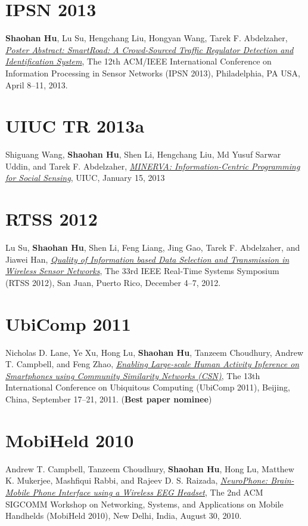 \section{\sc IPSN 2013}\hypertarget{hu2013ipsn}{} \textbf{Shaohan Hu}, Lu Su, Hengchang Liu, Hongyan Wang, Tarek F. Abdelzaher, \href{http://portal.acm.org/citation.cfm?id=2461433}{\emph{Poster Abstract: SmartRoad: A Crowd-Sourced Traffic Regulator Detection and Identification System}}, \textsf{The 12th ACM/IEEE International Conference on Information Processing in Sensor Networks (IPSN 2013)}, Philadelphia, PA USA, April 8--11, 2013.

\section{\sc UIUC TR 2013a}\hypertarget{wang2013uiuc}{} Shiguang Wang, \textbf{Shaohan Hu}, Shen Li, Hengchang Liu, Md Yusuf Sarwar Uddin, and Tarek F. Abdelzaher, \href{https://www.ideals.illinois.edu/handle/2142/42511}{\emph{MINERVA: Information-Centric Programming for Social Sensing}}, \textsf{UIUC}, January 15, 2013

\section{\sc RTSS 2012}\hypertarget{su2012rtss}{} Lu Su, \textbf{Shaohan Hu}, Shen Li, Feng Liang, Jing Gao, Tarek F. Abdelzaher, and Jiawei Han, \href{http://ieeexplore.ieee.org/xpl/articleDetails.jsp?arnumber=6424815}{\emph{Quality of Information based Data Selection and Transmission in Wireless Sensor Networks}}, \textsf{The 33rd IEEE Real-Time Systems Symposium (RTSS 2012)}, San Juan, Puerto Rico, December 4--7, 2012.

\section{\sc UbiComp 2011}\hypertarget{lane2011ubicomp}{} Nicholas D. Lane, Ye Xu, Hong Lu, \textbf{Shaohan Hu}, Tanzeem Choudhury, Andrew T. Campbell, and Feng Zhao, \href{http://portal.acm.org/citation.cfm?id=2030160}{\emph{Enabling Large-scale Human Activity Inference on Smartphones using Community Similarity Networks (CSN)}}, \textsf{The 13th International Conference on Ubiquitous Computing (UbiComp 2011)}, Beijing, China, September 17--21, 2011. (\textbf{Best paper nominee})

\section{\sc MobiHeld 2010}\hypertarget{campbell2010mobiheld}{} Andrew T. Campbell, Tanzeem Choudhury, \textbf{Shaohan Hu}, Hong Lu, Matthew K. Mukerjee, Mashfiqui Rabbi, and Rajeev D. S. Raizada, \href{http://portal.acm.org/citation.cfm?id=1851326}{\emph{NeuroPhone: Brain-Mobile Phone Interface using a Wireless EEG Headset}}, \textsf{The 2nd ACM SIGCOMM Workshop on Networking, Systems, and Applications on Mobile Handhelds (MobiHeld 2010)}, New Delhi, India, August 30, 2010.

